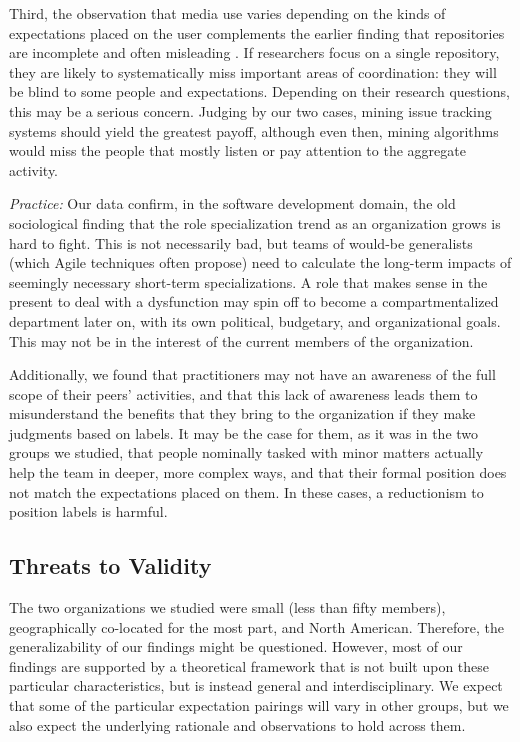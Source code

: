 \documentclass[10pt, conference, compsocconf]{IEEEtran}
\begin{document}
Third, the observation that media use varies depending on the kinds of expectations placed on the user complements the earlier finding that repositories are incomplete and often misleading \cite{Aranda2009}. If researchers focus on a single repository, they are likely to systematically miss important areas of coordination: they will be blind to some people and expectations. Depending on their research questions, this may be a serious concern. Judging by our two cases, mining issue tracking systems should yield the greatest payoff, although even then, mining algorithms would miss the people that mostly listen or pay attention to the aggregate activity.

\emph{Practice:} Our data confirm, in the software development domain, the old sociological finding that the role specialization trend as an organization grows is hard to fight. This is not necessarily bad, but teams of would-be generalists (which Agile techniques often propose) need to calculate the long-term impacts of seemingly necessary short-term specializations. A role that makes sense in the present to deal with a dysfunction may spin off to become a compartmentalized department later on, with its own political, budgetary, and organizational goals. This may not be in the interest of the current members of the organization.

Additionally, we found that practitioners may not have an awareness of the full scope of their peers' activities, and that this lack of awareness leads them to misunderstand the benefits that they bring to the organization if they make judgments based on labels. It may be the case for them, as it was in the two groups we studied, that people nominally tasked with minor matters actually help the team in deeper, more complex ways, and that their formal position does not match the expectations placed on them. In these cases, a reductionism to position labels is harmful.


\subsection{Threats to Validity}

The two organizations we studied were small (less than fifty members), geographically co-located for the most part, and North American. Therefore, the generalizability of our findings might be questioned. However, most of our findings are supported by a theoretical framework that is not built upon these particular characteristics, but is instead general and interdisciplinary. We expect that some of the particular expectation pairings will vary in other groups, but we also expect the underlying rationale and observations to hold across them.
\end{document}
